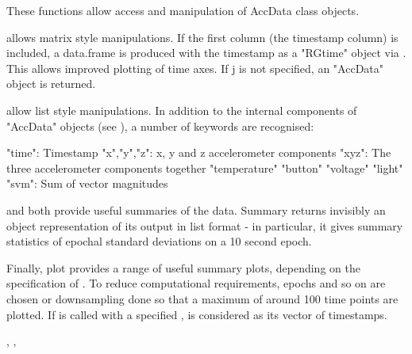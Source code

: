 \documentclass[a4paper]{book}
\begin{document}
\begin{Details}\relax
These functions allow access and manipulation of AccData class objects.

\code{[} allows matrix style manipulations. If the first column (the timestamp column) is included, a data.frame is produced with the timestamp as a "RGtime" object via . This allows improved plotting of time axes. If j is not specified, an "AccData" object is returned.

\code{\$} allow list style manipulations. In addition to the internal components of "AccData" objects (see ), a number of keywords are recognised:

"time": Timestamp
"x","y","z": x, y and z accelerometer components
"xyz": The three accelerometer components together
"temperature"
"button"
"voltage"
"light"
"svm": Sum of vector magnitudes

 and  both provide useful summaries of the data. Summary returns invisibly an object representation of its output in list format - in particular, it gives summary statistics of epochal standard deviations on a 10 second epoch.

Finally, plot provides a range of useful summary plots, depending on the specification of . To reduce computational requirements, epochs and so on are chosen or downsampling done so that a maximum of around 100 time points are plotted. If  is called with a specified ,  is considered as its vector of timestamps.
\end{Details}
%
\begin{SeeAlso}\relax
{}, , 
\end{SeeAlso}
%
\begin{Examples}
\end{Examples}
\end{document}
